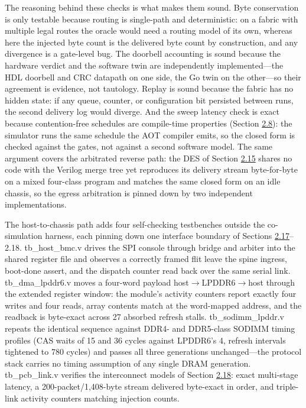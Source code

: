 \documentclass[12pt,onecolumn]{article}
\begin{document}
The reasoning behind these checks is what makes them sound. Byte conservation is only testable because routing is single-path and deterministic: on a fabric with multiple legal routes the oracle would need a routing model of its own, whereas here the injected byte count is the delivered byte count by construction, and any divergence is a gate-level bug. The doorbell accounting is sound because the hardware verdict and the software twin are independently implemented---the HDL doorbell and CRC datapath on one side, the Go twin on the other---so their agreement is evidence, not tautology. Replay is sound because the fabric has no hidden state: if any queue, counter, or configuration bit persisted between runs, the second delivery log would diverge. And the sweep latency check is exact because contention-free schedules are compile-time properties (Section \hyperref[sec:2.8]{2.8}): the simulator runs the same schedule the AOT compiler emits, so the closed form is checked against the gates, not against a second software model. The same argument covers the arbitrated reverse path: the DES of Section \hyperref[sec:2.15]{2.15} shares no code with the Verilog merge tree yet reproduces its delivery stream byte-for-byte on a mixed four-class program and matches the same closed form on an idle chassis, so the egress arbitration is pinned down by two independent implementations.

The host-to-chassis path adds four self-checking testbenches outside the co-simulation harness, each pinning down one interface boundary of Sections \hyperref[sec:2.17]{2.17}--2.18. tb\_host\_bmc.v drives the SPI console through bridge and arbiter into the shared register file and observes a correctly framed flit leave the spine ingress, boot-done assert, and the dispatch counter read back over the same serial link. tb\_dma\_lpddr6.v moves a four-word payload host$\to$LPDDR6$\to$host through the extended register window: the module's activity counters report exactly four writes and four reads, array contents match at the word-mapped address, and the readback is byte-exact across 27 absorbed refresh stalls. tb\_sodimm\_lpddr.v repeats the identical sequence against DDR4- and DDR5-class SODIMM timing profiles (CAS waits of 15 and 36 cycles against LPDDR6's 4, refresh intervals tightened to 780 cycles) and passes all three generations unchanged---the protocol stack carries no timing assumption of any single DRAM generation. tb\_pcb\_link.v verifies the interconnect models of Section \hyperref[sec:2.18]{2.18}: exact multi-stage latency, a 200-packet/1,408-byte stream delivered byte-exact in order, and triple-link activity counters matching injection counts.
\end{document}
